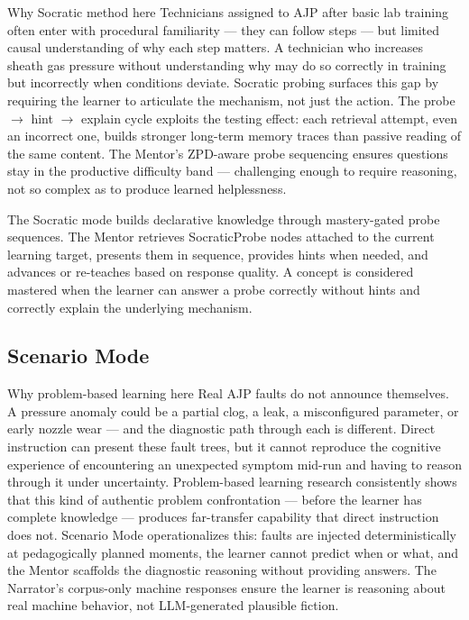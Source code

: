 \documentclass[11pt,letterpaper]{article}
\newcommand{\arrowto}{$\rightarrow$}
\begin{document}
\begin{rationale}{Why Socratic method here}
Technicians assigned to AJP after basic lab training often enter with procedural familiarity --- they can follow steps --- but limited causal understanding of why each step matters. A technician who increases sheath gas pressure without understanding why may do so correctly in training but incorrectly when conditions deviate. Socratic probing surfaces this gap by requiring the learner to articulate the mechanism, not just the action. The probe \arrowto{} hint \arrowto{} explain cycle exploits the testing effect: each retrieval attempt, even an incorrect one, builds stronger long-term memory traces than passive reading of the same content. The Mentor's ZPD-aware probe sequencing ensures questions stay in the productive difficulty band --- challenging enough to require reasoning, not so complex as to produce learned helplessness.
\end{rationale}

The Socratic mode builds declarative knowledge through mastery-gated probe sequences. The Mentor retrieves SocraticProbe nodes attached to the current learning target, presents them in sequence, provides hints when needed, and advances or re-teaches based on response quality. A concept is considered mastered when the learner can answer a probe correctly without hints and correctly explain the underlying mechanism.

\subsection{Scenario Mode}
\label{sec:scenario-mode}

\begin{rationale}{Why problem-based learning here}
Real AJP faults do not announce themselves. A pressure anomaly could be a partial clog, a leak, a misconfigured parameter, or early nozzle wear --- and the diagnostic path through each is different. Direct instruction can present these fault trees, but it cannot reproduce the cognitive experience of encountering an unexpected symptom mid-run and having to reason through it under uncertainty. Problem-based learning research consistently shows that this kind of authentic problem confrontation --- before the learner has complete knowledge --- produces far-transfer capability that direct instruction does not. Scenario Mode operationalizes this: faults are injected deterministically at pedagogically planned moments, the learner cannot predict when or what, and the Mentor scaffolds the diagnostic reasoning without providing answers. The Narrator's corpus-only machine responses ensure the learner is reasoning about real machine behavior, not LLM-generated plausible fiction.
\end{rationale}
\end{document}
